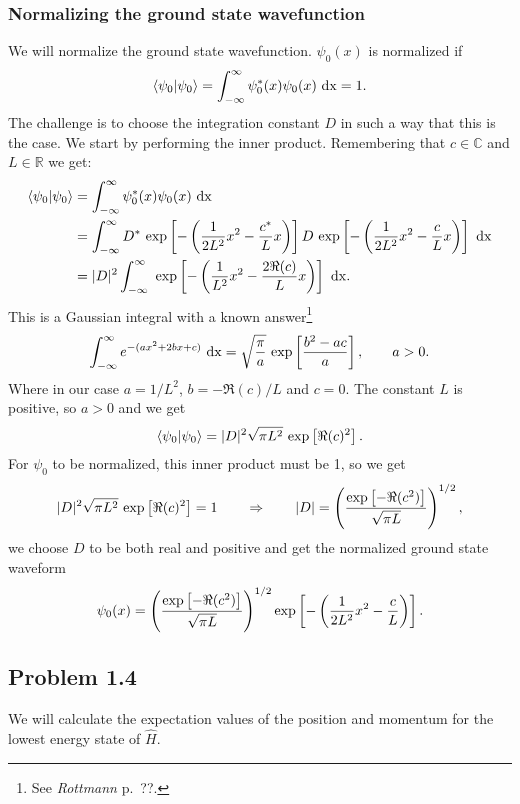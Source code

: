 \documentclass[a4paper, 11pt, titlepage, english]{article}
\newcommand{\braket}[2]{\langle #1 | #2 \rangle}
\newcommand{\op}[1]{\hat{#1}}
\begin{document}
\subsubsection*{Normalizing the ground state wavefunction}
We will normalize the ground state wavefunction. $\psi_0(x)$ is normalized if
$$\braket{\psi_0}{\psi_0} = \int_{-\infty}^{\infty} \psi_0^*(x)\psi_0(x) {\rm\ dx} = 1.$$
The challenge is to choose the integration constant $D$ in such a way that this is the case. We start by performing the inner product.
Remembering that $c\in\mathbb{C}$ and $L\in\mathbb{R}$ we get:
\begin{align*}
\braket{\psi_0}{\psi_0} &= \int_{-\infty}^{\infty} \psi_0^*(x)\psi_0(x) {\rm\ dx} \\
&= \int_{-\infty}^{\infty} D^*{\rm\ exp}\left[-\left(\frac{1}{2L^2}x^2 - \frac{c^*}{L}x\right) \right]D{\rm\ exp}\left[-\left(\frac{1}{2L^2}x^2 - \frac{c}{L}x\right) \right] {\rm\ dx} \\
&= |D|^2 \int_{-\infty}^{\infty} {\rm\ exp}\left[-\left(\frac{1}{L^2}x^2 - \frac{2\Re(c)}{L}x\right) \right] {\rm\ dx}.
\end{align*}
This is a Gaussian integral with a known answer\footnote{See \emph{Rottmann} p.\ ??.}
\begin{equation}
\int_{-\infty}^\infty e^{-(ax^2+2bx+c)} {\rm\ dx} = \sqrt{\frac{\pi}{a}}{\rm\ exp}\left[\frac{b^2-ac}{a}\right], \qquad {a > 0}. \label{eq:e}
\end{equation}
Where in our case $a = 1/L^2$, $b=-\Re(c)/L$ and $c=0$. The constant $L$ is positive, so $a>0$ and we get
$$\braket{\psi_0}{\psi_0} = |D|^2 \sqrt{\pi L^2}{\rm\ exp}\left[\Re(c)^2\right].$$
For $\psi_0$ to be normalized, this inner product must be 1, so we get
$$|D|^2 \sqrt{\pi L^2}{\rm\ exp}\left[\Re(c)^2\right] = 1 \qquad \Rightarrow \qquad |D| = \left(\frac{{\rm exp}\left[-\Re(c^2)\right]}{\sqrt{\pi L}}\right)^{1/2},$$
we choose $D$ to be both real and positive and get the normalized ground state waveform
$$\psi_0(x) =  \left(\frac{{\rm exp}\left[-\Re(c^2)\right]}{\sqrt{\pi L}}\right)^{1/2}{\rm exp} \left[-\left(\frac{1}{2L^2}x^2 - \frac{c}{L}\right)\right].$$

\subsection*{Problem 1.4}
We will calculate the expectation values of the position and momentum for the lowest energy state of $\op H$.
\end{document}
